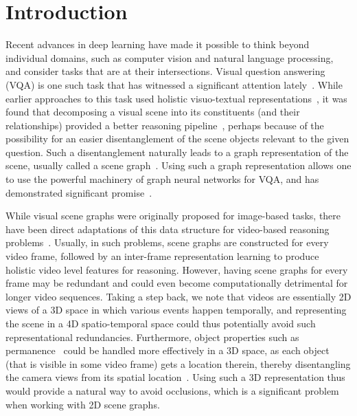 \documentclass[letterpaper]{article} %
\begin{document}
\section{Introduction}
Recent advances in deep learning have made it possible to think beyond individual domains, such as computer vision and natural language processing, and consider tasks that are at their intersections. Visual question answering (VQA) is one such task that has witnessed a significant attention lately~\cite{antol2015vqa,anderson2018bottom,wu2017visual,jang2017tgif,geng2021dynamic,chen2020counterfactual,ghosh2019generating}. While earlier approaches to this task used holistic visuo-textual representations~\cite{dang2021hierarchical,antol2015vqa}, it was found that decomposing a visual scene into its constituents (and their relationships) provided a better reasoning pipeline~\cite{anderson2018bottom,johnson2015image,krishna2017visual,dornadula2019visual}, perhaps because of the possibility for an easier disentanglement of the scene objects relevant to the given question. Such a disentanglement naturally leads to a graph representation of the scene, usually called a scene graph~\cite{johnson2015image}. Using such a graph representation allows one to use the powerful machinery of graph neural networks for VQA, and has demonstrated significant promise~\cite{li2019know,li2019relation,pan2020spatio,geng2021dynamic}.

While visual scene graphs were originally proposed for image-based tasks, there have been direct adaptations of this data structure for video-based reasoning problems~\cite{geng2021dynamic,chatterjee2021visual,pan2020spatio,herzig2019spatio}. Usually, in such problems, scene graphs are constructed for every video frame, followed by an inter-frame representation learning to produce holistic video level features for reasoning. However, having scene graphs for every frame may be redundant and could even become computationally detrimental for longer video sequences. Taking a step back, we note that videos are essentially 2D views of a 3D space in which various events happen temporally, and representing the scene in a 4D spatio-temporal space could thus potentially avoid such representational redundancies. Furthermore, object properties such as permanence~\cite{shamsian2020learning} could be handled more effectively in a 3D space, as each object (that is visible in some video frame) gets a location therein, thereby disentangling the camera views from its spatial location~\cite{tung20203d,girdhar2019cater}. Using such a 3D representation thus would provide a natural way to avoid occlusions, which is a significant problem when working with 2D scene graphs.
\end{document}
